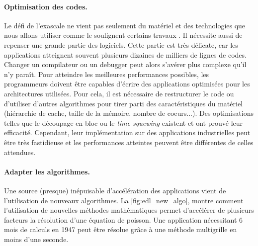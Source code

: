        
        \paragraph{Optimisation des codes.} 
            
            Le défi de l’exascale ne vient pas seulement du matériel et des technologies que nous allons utiliser comme le soulignent certains travaux \cite{barrett2012navigating}. Il  nécessite aussi de repenser une grande partie des logiciels. Cette partie est très délicate, car les applications atteignent souvent plusieurs dizaines de milliers de lignes de codes. Changer un compilateur ou un debugger peut alors s’avérer plus complexe qu'il n’y paraît. Pour atteindre les meilleures performances possibles, les programmeurs doivent être capables d'écrire des applications optimisées pour les architectures utilisées. Pour cela, il est nécessaire de restructurer le code ou d'utiliser d'autres algorithmes pour tirer parti des caractéristiques du matériel (hiérarchie de cache, taille de la mémoire, nombre de coeurs...). Des optimisations telles que le découpage en bloc \cite{Xue2012} ou le \textit{time squewing} \cite{Wonnacott2002} existent et ont prouvé leur efficacité. Cependant, leur implémentation sur des applications industrielles peut être très fastidieuse et les performances atteintes peuvent être différentes de celles attendues. 
            

        \paragraph{Adapter les algorithmes.} Une source (presque) inépuisable d'accélération des applications vient de l'utilisation de nouveaux algorithmes. La \autoref{fig:edl_new_algo}, montre comment l'utilisation de nouvelles méthodes mathématiques permet d'accélérer de plusieurs facteurs la résolution d'une équation de poisson. Une application nécessitant 6 mois de calculs en 1947 peut être résolue grâce à une méthode multigrille \cite{Brandt1982} en moins d'une seconde.
            
